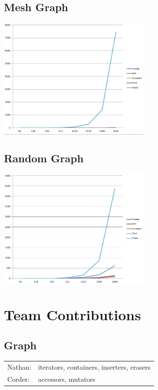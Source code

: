 \documentclass[titlepage]{article}
\newenvironment{Figure}
  {\par\medskip\noindent\minipage{\linewidth}}
  {\endminipage\par\medskip}
\begin{document}
\begin{multicols*}{2}
                \subsection{Mesh Graph}
                \begin{Figure}
                    \centering
                    \includegraphics[width=3in]{mesh}
                \end{Figure}



                \subsection{Random Graph}
                \begin{Figure}
                    \centering
                    \includegraphics[width=3in]{random}
                \end{Figure}

        \section{Team Contributions}
            \subsection{Graph}
                \begin{tabular}{l l}
                    Nathan: & iterators, containers, inserters, erasers \\
                    Corder: & accessors, mutators
                \end{tabular}

\end{multicols*}
\end{document}
